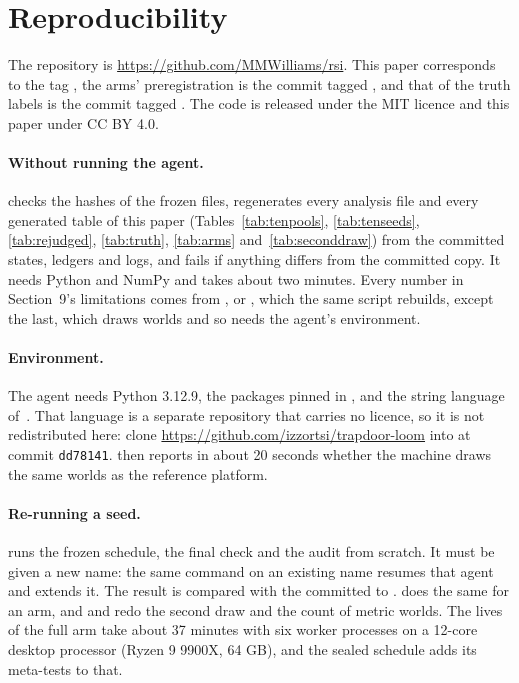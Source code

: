 \documentclass[11pt]{article}
\begin{document}
\section{Reproducibility}
\label{sec:repro}

The repository is \url{https://github.com/MMWilliams/rsi}. This paper corresponds to the tag , the arms' preregistration is the commit tagged , and that of the truth labels is the commit tagged . The code is released under the MIT licence and this paper under CC BY 4.0.

\paragraph{Without running the agent.}  checks the hashes of the frozen files, regenerates every analysis file and every generated table of this paper (Tables~\ref{tab:tenpools}, \ref{tab:tenseeds}, \ref{tab:rejudged}, \ref{tab:truth}, \ref{tab:arms} and~\ref{tab:seconddraw}) from the committed states, ledgers and logs, and fails if anything differs from the committed copy. It needs Python and NumPy and takes about two minutes. Every number in Section~9's limitations comes from ,  or , which the same script rebuilds, except the last, which draws worlds and so needs the agent's environment.

\paragraph{Environment.} The agent needs Python 3.12.9, the packages pinned in , and the string language of~\cite{strozzi2026}. That language is a separate repository that carries no licence, so it is not redistributed here: clone \url{https://github.com/izzortsi/trapdoor-loom} into  at commit \texttt{dd78141}.  then reports in about 20 seconds whether the machine draws the same worlds as the reference platform.

\paragraph{Re-running a seed.}  runs the frozen schedule, the final check and the audit from scratch. It must be given a new name: the same command on an existing name resumes that agent and extends it. The result is compared with the committed  to .  does the same for an arm, and  and  redo the second draw and the count of metric worlds. The lives of the full arm take about 37 minutes with six worker processes on a 12-core desktop processor (Ryzen 9 9900X, 64 GB), and the sealed schedule adds its meta-tests to that.
\end{document}
